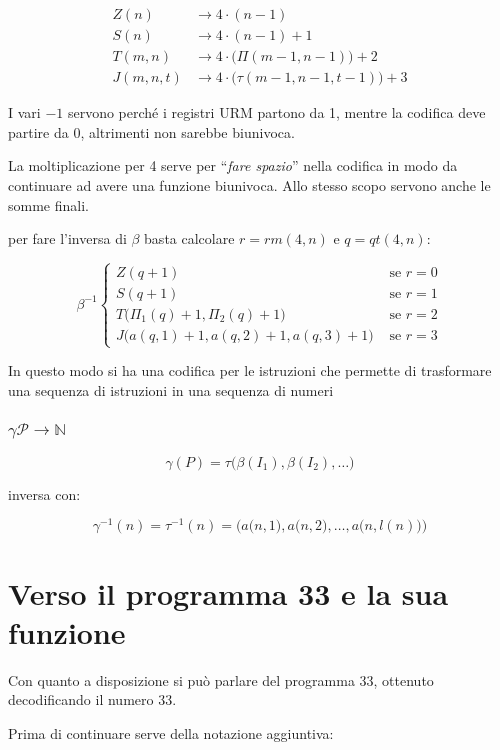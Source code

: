 \begin{align*}
Z(n) &\rightarrow 4\cdot(n-1) \\
S(n) &\rightarrow 4\cdot(n-1)+1 \\ 
T(m,n) &\rightarrow 4\cdot\big(\Pi(m-1,n-1)\big)+2 \\
J(m,n,t) &\rightarrow 4\cdot\big(\tau(m-1,n-1,t-1)\big)+3
\end{align*}

I vari $ -1 $ servono perché i registri URM partono da 1, mentre la codifica deve partire da 0, altrimenti non sarebbe biunivoca.

La moltiplicazione per 4 serve per ``\textit{fare spazio}'' nella codifica in modo da continuare ad avere una funzione biunivoca. Allo stesso scopo servono anche le somme finali.

per fare l'inversa di $ \beta $ basta calcolare $ r = rm(4,n) $ e $ q = qt(4,n) $:

$$
\beta^{-1} \begin{cases}
Z(q+1) &\text{ se } r=0 \\
S(q+1) &\text{ se } r=1 \\
T\big(\Pi_1(q)+1, \Pi_2(q)+1\big) &\text{ se } r=2 \\
J\big(a(q,1)+1,a(q,2)+1,a(q,3)+1\big)&\text{ se } r=3
\end{cases}
$$

In questo modo si ha una codifica per le istruzioni che permette di trasformare una sequenza di istruzioni in una sequenza di numeri

\subsubsection{$ \gamma \mathcal{P} \rightarrow \mathbb{N} $}

$$
\gamma(P) = \tau\big(\beta(I_1), \beta(I_2), \ldots\big)
$$

inversa con:

$$
\gamma^{-1}(n) = \tau^{-1}(n) = \Big(a\big(n,1\big), a\big(n,2\big), \ldots, a\big(n,l(n)\big)\Big)
$$

\section{Verso il programma 33 e la sua funzione}

Con quanto a disposizione si può parlare del programma 33, ottenuto decodificando il numero 33.

Prima di continuare serve della notazione aggiuntiva:

